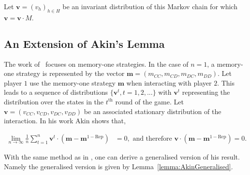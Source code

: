 \documentclass{article}
\theoremstyle{definition}
\begin{document}
Let $\mathbf{v}=(v_h)_{h\in H}$ be an invariant distribution of this Markov
chain for which $\mathbf{v} = \mathbf{v} \cdot M$.


\subsection{An Extension of Akin's Lemma}

The work of~\citep{akin:EGADS:2016} focuses on memory-one strategies. In the
case of $n=1$, a memory-one strategy is represented by the vector
\(\mathbf{m}=(m_{CC}, m_{CD}, m_{DC}, m_{DD})\). Let player $1$ use the
memory-one strategy $\mathbf{m}$ when interacting with player $2$. This leads to
a sequence of distributions \(\{\mathbf{v}^{t}, t = 1, 2, ...\}\) with
\(\mathbf{v}^{t}\) representing the distribution over the states in the
\(t^{\text{th}}\) round of the game. Let $\mathbf{v} = (v_{CC}, v_{CD}, v_{DC}, v_{DD})$ be an associated
stationary distribution of the interaction. In his work Akin shows that,

\begin{align}
  \lim_{n \rightarrow \infty} \frac{1}{n} \sum_{t=1}^{n} \mathbf{v}^{t} \cdot (\mathbf{m} - \mathbf{m}^{1-\text{Rep}}) & = 0, \text{ and therefore } \mathbf{v} \cdot (\mathbf{m} - \mathbf{m}^{1-\text{Rep}}) = 0.
\end{align}

With the same method as in \citep{akin:EGADS:2016}, one can derive a generalised
version of his result. Namely the generalised version is given by
Lemma~\ref{lemma:AkinGeneralised}.
\end{document}
